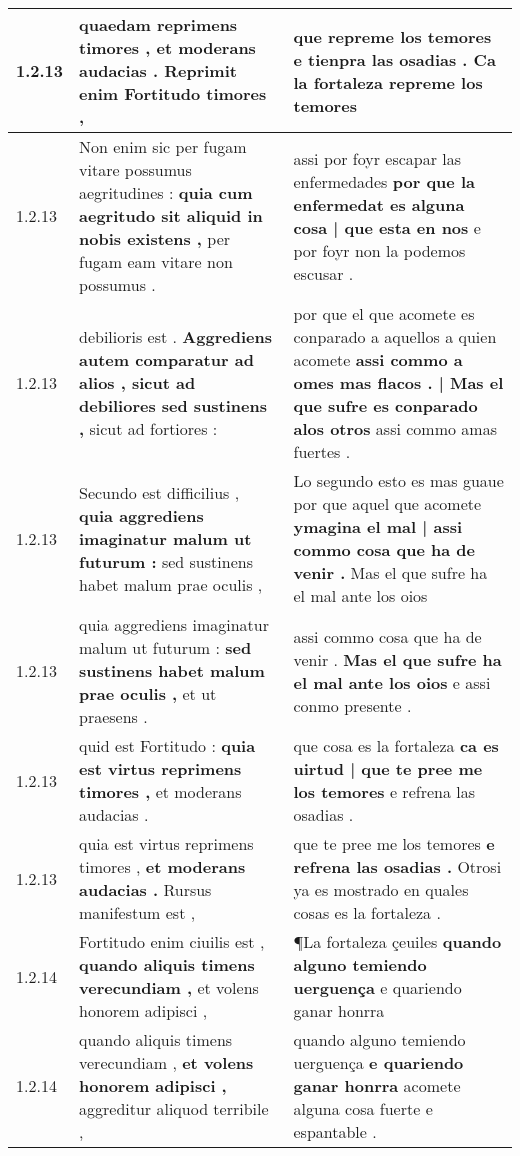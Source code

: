 \begin{tabular}{|p{1cm}|p{6.5cm}|p{6.5cm}|}
1.2.13 & quaedam reprimens timores , \textbf{ et moderans audacias . } Reprimit enim Fortitudo timores , & que repreme los temores \textbf{ e tienpra las osadias . } Ca la fortaleza repreme los temores \\\hline
1.2.13 & Non enim sic per fugam vitare possumus aegritudines : \textbf{ quia cum aegritudo sit aliquid in nobis existens , } per fugam eam vitare non possumus . & assi por foyr escapar las enfermedades \textbf{ por que la enfermedat es alguna cosa | que esta en nos } e por foyr non la podemos escusar . \\\hline
1.2.13 & debilioris est . \textbf{ Aggrediens autem comparatur ad alios , sicut ad debiliores sed sustinens , } sicut ad fortiores : & por que el que acomete es conparado a aquellos a quien acomete \textbf{ assi commo a omes mas flacos . | Mas el que sufre es conparado alos otros } assi commo amas fuertes . \\\hline
1.2.13 & Secundo est difficilius , \textbf{ quia aggrediens imaginatur malum ut futurum : } sed sustinens habet malum prae oculis , & Lo segundo esto es mas guaue por que aquel que acomete \textbf{ ymagina el mal | assi commo cosa que ha de venir . } Mas el que sufre ha el mal ante los oios \\\hline
1.2.13 & quia aggrediens imaginatur malum ut futurum : \textbf{ sed sustinens habet malum prae oculis , } et ut praesens . & assi commo cosa que ha de venir . \textbf{ Mas el que sufre ha el mal ante los oios } e assi conmo presente . \\\hline
1.2.13 & quid est Fortitudo : \textbf{ quia est virtus reprimens timores , } et moderans audacias . & que cosa es la fortaleza \textbf{ ca es uirtud | que te pree me los temores } e refrena las osadias . \\\hline
1.2.13 & quia est virtus reprimens timores , \textbf{ et moderans audacias . } Rursus manifestum est , & que te pree me los temores \textbf{ e refrena las osadias . } Otrosi ya es mostrado en quales cosas es la fortaleza . \\\hline
1.2.14 & Fortitudo enim ciuilis est , \textbf{ quando aliquis timens verecundiam , } et volens honorem adipisci , & ¶La fortaleza çeuiles \textbf{ quando alguno temiendo uerguença } e quariendo ganar honrra \\\hline
1.2.14 & quando aliquis timens verecundiam , \textbf{ et volens honorem adipisci , } aggreditur aliquod terribile , & quando alguno temiendo uerguença \textbf{ e quariendo ganar honrra } acomete alguna cosa fuerte e espantable . \\\hline

\end{tabular}
